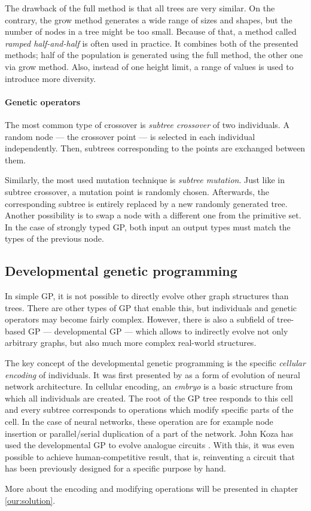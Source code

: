 The drawback of the full method is that all trees are very similar. On the
contrary, the grow method generates a wide range of sizes and shapes, but the
number of nodes in a tree might be too small. Because of that, a method called
\emph{ramped half-and-half} is often used in practice. It combines both 
of the presented methods; half of the population is generated using the full
method, the other one via grow method. Also, instead of one height limit, a
range of values is used to introduce more diversity.
\citep{Poli:2008:FGG:1796422}

\paragraph{Genetic operators} \label{treeops}
The most common type of crossover is \emph{subtree crossover} of two
individuals. A random node --- the crossover point ---
is selected in each individual independently. Then, subtrees corresponding
to the points are exchanged between them.

Similarly, the most used mutation technique is \emph{subtree mutation}.
Just like in subtree crossover, a mutation point is randomly chosen.
Afterwards, the corresponding subtree is entirely replaced by a new randomly
generated tree. Another possibility is to swap a node with a different one
from the primitive set. In the case of strongly typed GP, both input an output
types must match the types of the previous node.
\citep{Poli:2008:FGG:1796422}

\subsection{Developmental genetic programming} \label{devGP}
In simple GP, it is not possible to directly evolve other graph structures
than trees. There are other types of GP that enable this, but individuals
and genetic operators may become fairly complex. However, there is also a
subfield of tree-based GP --- developmental GP --- which allows to indirectly
evolve not only arbitrary graphs, but also much more complex real-world
structures.

The key concept of the developmental genetic programming is the
specific \emph{cellular encoding} of individuals. It was first presented by
\cite{Gruau:1994:thesis} as a form of evolution of neural network architecture.
In cellular encoding, an \emph{embryo} is a basic structure from which all
individuals are created.
The root of the GP tree responds to this cell and every subtree corresponds
to operations which modify specific parts of the cell. In the case of neural
networks, these operation are for example node insertion or parallel/serial
duplication of a part of the network. John Koza has used the developmental GP
to evolve analogue circuits \citep{Koza:1998:circuits}. With this, it was even
possible to achieve human-competitive result, that is, reinventing a circuit
that has been previously designed for a specific purpose by hand.

More about the encoding and modifying operations will be presented in
chapter \ref{our:solution}.